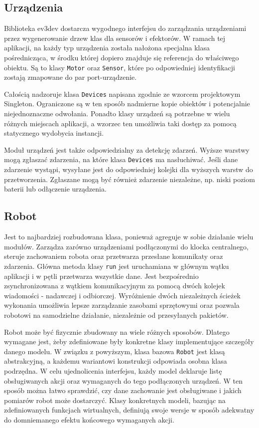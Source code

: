 
\subsection{Urządzenia}

\indent \indent Biblioteka ev3dev dostarcza wygodnego interfejsu do zarządzania urządzeniami przez wygenerowanie drzew klas dla sensorów i efektorów. W ramach tej aplikacji, na każdy typ urządzenia została nałożona specjalna klasa pośrednicząca, w środku której dopiero znajduje się referencja do właściwego obiektu. Są to klasy {\tt Motor} oraz {\tt Sensor}, które po odpowiedniej identyfikacji zostają zmapowane do par port-urządzenie.

Całością nadzoruje klasa {\tt Devices} napisana zgodnie ze wzorcem projektowym Singleton. Ograniczone są w ten sposób nadmierne kopie obiektów i potencjalnie niejednoznaczne odwołania. Ponadto klasy urządzeń są potrzebne w wielu różnych miejscach aplikacji, a wzorzec ten umożliwia taki dostęp za pomocą statycznego wydobycia instancji.

Moduł urządzeń jest także odpowiedzialny za detekcję zdarzeń. Wyższe warstwy mogą zgłaszać zdarzenia, na które klasa {\tt Devices} ma nasłuchiwać. Jeśli dane zdarzenie wystąpi, wysyłane jest do odpowiedniej kolejki dla wyższych warstw do przetworzenia. Zgłaszane mogą być również zdarzenie niezależne, np. niski poziom baterii lub odłączenie urządzenia.


\subsection{Robot}

\indent \indent Jest to najbardziej rozbudowana klasa, ponieważ agreguje w sobie działanie wielu modułów. Zarządza zarówno urządzeniami podłączonymi do klocka centralnego, steruje zachowaniem robota oraz przetwarza przesłane komunikaty oraz zdarzenia. Główna metoda klasy {\tt run} jest uruchamiana w głównym wątku aplikacji i w pętli przetwarza wszystkie dane. Jest bezpośrednio zsynchronizowana z wątkiem komunikacyjnym za pomocą dwóch kolejek wiadomości - nadawczej i odbiorczej. Wyróżnienie dwóch niezależnych ścieżek wykonania umożliwia lepsze zarządzanie zasobami sprzętowymi oraz pozwala robotowi na samodzielne działanie, niezależnie od przesyłanych pakietów.

Robot może być fizycznie zbudowany na wiele różnych sposobów. Dlatego wymagane jest, żeby zdefiniowane były konkretne klasy implementujące szczegóły danego modelu. W związku z powyższym, klasa bazowa {\tt Robot} jest klasą abstrakcyjną, a każdemu wariantowi konstrukcji odpowiada osobna klasa podrzędna. W celu ujednolicenia interfejsu, każdy model deklaruje listę obsługiwanych akcji oraz wymaganych do tego podłączonych urządzeń. W ten sposób można łatwo sprawdzić, czy dane zachowanie jest obsługiwane i jakich pomiarów robot może dostarczyć. Klasy konkretnych modeli, bazując na zdefiniowanych funkcjach wirtualnych, definiują swoje wersje w sposób adekwatny do domniemanego efektu końcowego wymaganych akcji.

